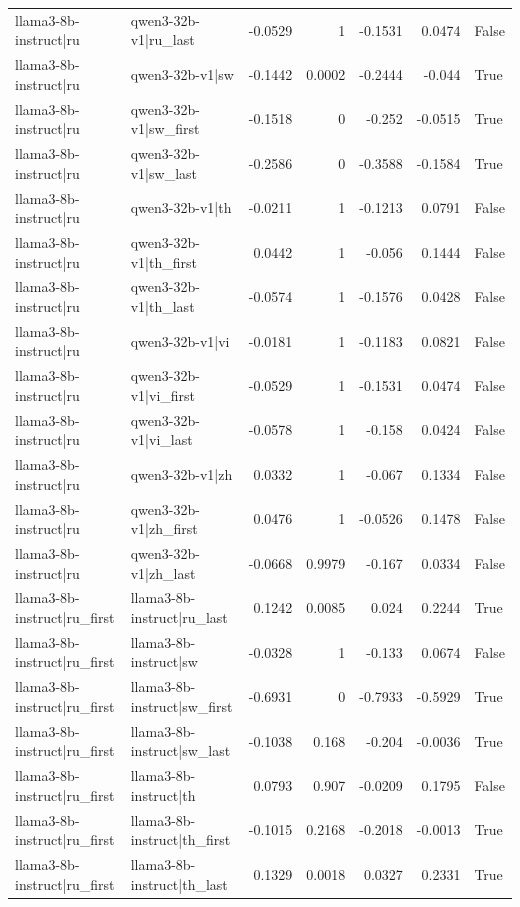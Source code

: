 \begin{table}
\begin{tabular}{l l r r r r l}
llama3-8b-instruct|ru & qwen3-32b-v1|ru_last & -0.0529 & 1 & -0.1531 & 0.0474 & False \\
llama3-8b-instruct|ru & qwen3-32b-v1|sw & -0.1442 & 0.0002 & -0.2444 & -0.044 & True \\
llama3-8b-instruct|ru & qwen3-32b-v1|sw_first & -0.1518 & 0 & -0.252 & -0.0515 & True \\
llama3-8b-instruct|ru & qwen3-32b-v1|sw_last & -0.2586 & 0 & -0.3588 & -0.1584 & True \\
llama3-8b-instruct|ru & qwen3-32b-v1|th & -0.0211 & 1 & -0.1213 & 0.0791 & False \\
llama3-8b-instruct|ru & qwen3-32b-v1|th_first & 0.0442 & 1 & -0.056 & 0.1444 & False \\
llama3-8b-instruct|ru & qwen3-32b-v1|th_last & -0.0574 & 1 & -0.1576 & 0.0428 & False \\
llama3-8b-instruct|ru & qwen3-32b-v1|vi & -0.0181 & 1 & -0.1183 & 0.0821 & False \\
llama3-8b-instruct|ru & qwen3-32b-v1|vi_first & -0.0529 & 1 & -0.1531 & 0.0474 & False \\
llama3-8b-instruct|ru & qwen3-32b-v1|vi_last & -0.0578 & 1 & -0.158 & 0.0424 & False \\
llama3-8b-instruct|ru & qwen3-32b-v1|zh & 0.0332 & 1 & -0.067 & 0.1334 & False \\
llama3-8b-instruct|ru & qwen3-32b-v1|zh_first & 0.0476 & 1 & -0.0526 & 0.1478 & False \\
llama3-8b-instruct|ru & qwen3-32b-v1|zh_last & -0.0668 & 0.9979 & -0.167 & 0.0334 & False \\
llama3-8b-instruct|ru_first & llama3-8b-instruct|ru_last & 0.1242 & 0.0085 & 0.024 & 0.2244 & True \\
llama3-8b-instruct|ru_first & llama3-8b-instruct|sw & -0.0328 & 1 & -0.133 & 0.0674 & False \\
llama3-8b-instruct|ru_first & llama3-8b-instruct|sw_first & -0.6931 & 0 & -0.7933 & -0.5929 & True \\
llama3-8b-instruct|ru_first & llama3-8b-instruct|sw_last & -0.1038 & 0.168 & -0.204 & -0.0036 & True \\
llama3-8b-instruct|ru_first & llama3-8b-instruct|th & 0.0793 & 0.907 & -0.0209 & 0.1795 & False \\
llama3-8b-instruct|ru_first & llama3-8b-instruct|th_first & -0.1015 & 0.2168 & -0.2018 & -0.0013 & True \\
llama3-8b-instruct|ru_first & llama3-8b-instruct|th_last & 0.1329 & 0.0018 & 0.0327 & 0.2331 & True \\

\end{tabular}
\end{table}
